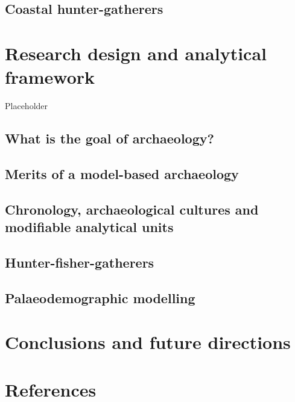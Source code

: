 \documentclass[
  oneside]{book}
\begin{document}
\hypertarget{coastal-hunter-gatherers}{%
\section{Coastal hunter-gatherers}\label{coastal-hunter-gatherers}}

\hypertarget{research-design-and-analytical-framework}{%
\chapter{Research design and analytical framework}\label{research-design-and-analytical-framework}}

Placeholder

\hypertarget{what-is-the-goal-of-archaeology}{%
\section{What is the goal of archaeology?}\label{what-is-the-goal-of-archaeology}}

\hypertarget{merits-of-a-model-based-archaeology}{%
\section{Merits of a model-based archaeology}\label{merits-of-a-model-based-archaeology}}

\hypertarget{chronology-archaeological-cultures-and-modifiable-analytical-units}{%
\section{Chronology, archaeological cultures and modifiable analytical units}\label{chronology-archaeological-cultures-and-modifiable-analytical-units}}

\hypertarget{hunter-fisher-gatherers}{%
\section{Hunter-fisher-gatherers}\label{hunter-fisher-gatherers}}

\hypertarget{palaeodemographic-modelling}{%
\section{Palaeodemographic modelling}\label{palaeodemographic-modelling}}

\hypertarget{conclusions-and-future-directions}{%
\chapter{Conclusions and future directions}\label{conclusions-and-future-directions}}

\hypertarget{references}{%
\chapter*{References}\label{references}}
\end{document}
